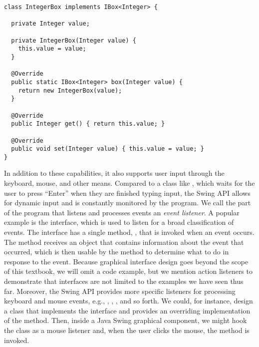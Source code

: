 \begin{lstlisting}[language=MyJava]
class IntegerBox implements IBox<Integer> {
  
  private Integer value;
  
  private IntegerBox(Integer value) { 
    this.value = value; 
  }
  
  @Override
  public static IBox<Integer> box(Integer value) { 
    return new IntegerBox(value); 
  }
  
  @Override
  public Integer get() { return this.value; }
  
  @Override
  public void set(Integer value) { this.value = value; }
}
\end{lstlisting}

In addition to these capabilities, it also supports user input through the keyboard, mouse, and other means. 
Compared to a class like , which waits for the user to press ``Enter'' when they are finished typing input, the Swing API allows for dynamic input and is constantly monitored by the program. 
We call the part of the program that listens and processes events an \emph{event listener}. 
A popular example is the  interface, which is used to listen for a broad classification of events. 
The  interface has a single method, , that is invoked when an event occurs. 
The  method receives an  object that contains information about the event that occurred, which is then usable by the method to determine what to do in response to the event. 
Because graphical interface design goes beyond the scope of this textbook, we will omit a code example, but we mention action listeners to demonstrate that interfaces are not limited to the examples we have seen thus far. 
Moreover, the Swing API provides more specific listeners for processing keyboard and mouse events, e.g., , , , and so forth. 
We could, for instance, design a class that implements the  interface and provides an overriding implementation of the  method. 
Then, inside a Java Swing graphical component, we might hook the class as a mouse listener and, when the user clicks the mouse, the  method is invoked.



